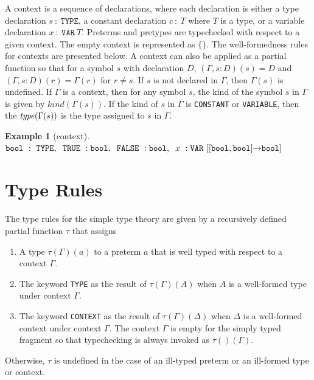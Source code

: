 \documentclass [12pt,twoside]{cslreport}
\newcommand{\thmbox}
   {{\ \hfill\hbox{%
      \vrule width1.0ex height1.0ex
   }\parfillskip 0pt }}
\newtheorem{example}[thm]{Example}
\newcommand{\aro}{\mathord\rightarrow} %
\newcommand{\funtype}[2]{[#1 \aro #2]}
\newcommand{\tupletype}[1]{[#1]}
\newcommand{\tauGamma}[1]{\tau(\Gamma)(#1)}
\newenvironment{Eg}[1]{\begin{example}[#1]\label{eg:#1}\em }{\thmbox\end{example}}
\begin{document}
A context is 
 a sequence of
declarations, where each declaration is either a type declaration
$s\ :\ \mathtt{TYPE}$, a constant declaration $c\ :\ T$ where $T$ is a type,
or a variable declaration $x\ :\ \mathtt{VAR}\ T$.
Preterms and pretypes are typechecked with respect to a given context.  
The empty context is represented as $\{\}$\@.  
The well-formedness rules
for contexts are presented below.
A context can also be applied as a
partial function so that for a symbol $s$ with declaration $D$, $(\Gamma, s
: D)(s) = D$ and 
$(\Gamma, s : D)(r) = \Gamma(r)$ for $r\neq s$.
If $s$ is not declared in $\Gamma$, then $\Gamma(s)$ is undefined. 
If $\Gamma$ is a context, then
for any symbol $s$, the kind of the symbol $s$ in $\Gamma$ is given by $\textit{kind}(\Gamma(s))$.  If the kind of $s$ in $\Gamma$ is \texttt{CONSTANT} or
\texttt{VARIABLE}, then the $ \textit{type\/}(\Gamma(s))$ is the type assigned
to $s$ in $\Gamma$.  
\newcommand{\coln}[2]{#1\ : #2}

\begin{Eg}{context}\hfill\\
$ \mathtt{bool}\ :\  \mathtt{TYPE},\hspace{.2cm} \coln{ \mathtt{TRUE}}{
\mathtt{bool}},\hspace{.2cm} \coln{ \mathtt{FALSE}}{
\mathtt{bool}},\hspace{.2cm} \coln{x}{ \mathtt{VAR}\ \funtype{\tupletype{
\mathtt{bool}, \mathtt{bool}}}{ \mathtt{bool} }}$ 
\end{Eg}


\section{Type Rules}

The type rules for the simple type theory are given by a recursively
defined partial function
$\tau$ that assigns
\begin{enumerate}
\item  A type $\tau(\Gamma)(a)$ to a preterm $a$ that
is well typed with
respect to a context $\Gamma$. 
\item  The keyword \texttt{TYPE} as the result of $\tauGamma{A}$
when $A$ is a  well-formed type under context $\Gamma$\@.

\item  The keyword \texttt{CONTEXT} as the result of
$\tauGamma{\Delta}$ when $\Delta$ is a well-formed context
under context $\Gamma$\@.  The context $\Gamma$ is empty for the
simply typed fragment so that typechecking is always invoked as
$\tau()(\Gamma)$\@. 
\end{enumerate}
Otherwise, $\tau$ is undefined in the case of an ill-typed preterm or an
ill-formed type or context. 
\end{document}
